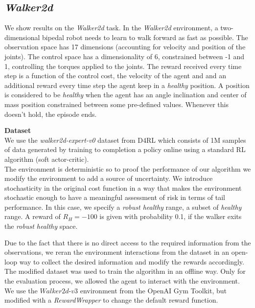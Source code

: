 \clearpage

\subsection{\textit{Walker2d}}

We show results on the \textit{Walker2d} task.
In the \textit{Walker2d} environment, a two-dimensional bipedal robot needs to learn to walk forward
as fast as possible.
The observation space has 17 dimensions (accounting for velocity and position of the joints).
The control space has a dimensionality of 6, constrained between -1 and 1, 
controlling the torques applied to the joints.
The reward received every time step is a function of the control cost, the velocity of the agent and 
and an additional reward every time step the agent keep in a \textit{healthy} position.
A position is considered to be \textit{healthy} when the agent has an angle inclination and center of mass
position constrained between some pre-defined values. Whenever this doesn't hold, the episode ends.

\textbf{Dataset}\\
We use the \textit{walker2d-expert-v0} dataset from D4RL which consists of 1M samples of data generated by
training to completion a policy online using a standard RL algorithm (soft actor-critic).\\
The environment is deterministic so to proof the performance of our algorithm we modify the environment to
add a source of uncertainty. We introduce stochasticity in the original cost function in a way that 
makes the environment stochastic enough to have a meaningful assessment of risk in terms of 
tail performance.
In this case, we specify a \textit{robust healthy} range, a subset of \textit{healthy} range.
A reward of $R_H=-100$ is given with probability 0.1, if the walker exits the \textit{robust healthy} space.

Due to the fact that there is no direct access to the required information from the observations,
we reran the environment interactions from the dataset in an open-loop way to collect the desired information and 
modify the rewards accordingly.
The modified dataset was used to train the algorithm in an offline way.
Only for the evaluation process, we allowed the agent to interact with the environment.
We use the $\textit{Walker2d-v3}$ environment from the OpenAI Gym Toolkit, but modified with a 
\textit{RewardWrapper} to change the default reward function.\\

